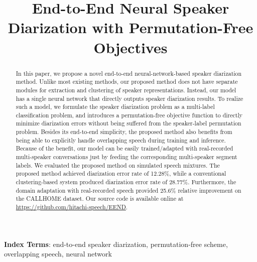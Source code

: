 \documentclass[a4paper]{article}
\title{End-to-End Neural Speaker Diarization with Permutation-Free Objectives}
\begin{document}
\maketitle
\begin{abstract}
In this paper, we propose a novel end-to-end neural-network-based speaker diarization method.
Unlike most existing methods, our proposed method does not have separate modules for extraction and clustering of speaker representations.
Instead, our model has a single neural network that directly outputs speaker diarization results.
To realize such a model, we formulate the speaker diarization problem as a multi-label classification problem, and introduces a permutation-free objective function to directly minimize diarization errors without being suffered from the speaker-label permutation problem.
Besides its end-to-end simplicity, the proposed method also benefits from being able to explicitly handle overlapping speech during training and inference.
Because of the benefit, our model can be easily trained/adapted with real-recorded multi-speaker conversations just by feeding the corresponding multi-speaker segment labels.
We evaluated the proposed method on simulated speech mixtures.
The proposed method achieved diarization error rate of 12.28\%, while a conventional clustering-based system produced diarization error rate of 28.77\%.
Furthermore, the domain adaptation with real-recorded speech provided 25.6\% relative improvement on the CALLHOME dataset.
Our source code is available online at \url{https://github.com/hitachi-speech/EEND}.

\begin{comment}
In this paper, we propose a novel end-to-end neural speaker diarization method that directly optimizes a diarization-error-oriented objective.
Unlike most existing methods, our proposed method does not have separate modules for extraction and clustering of speaker representations.
These modules are integrated into one neural network that can be jointly optimized to minimize diarization errors.
To realize such an optimization, we formulate the speaker diarization problem as a multi-label classification problem, and introduces permutation-free schemes to solve the speaker-label permutation problem.
Besides its end-to-end simplicity, the proposed method also benefits from being able to explicitly handle overlapping speech during training and inference.
The model can be trained/adapted with real-recorded multi-speaker conversations and the corresponding multi-speaker segment ground truth labeling.
We evaluated the proposed method on simulated speech mixtures.
The proposed method achieved diarization error rate of 12.28\%, while a conventional clustering-based system produced diarization error rate of 28.77\%.
\end{comment}
\end{abstract}
\noindent\textbf{Index Terms}: end-to-end speaker diarization, permutation-free scheme, overlapping speech, neural network
\end{document}
